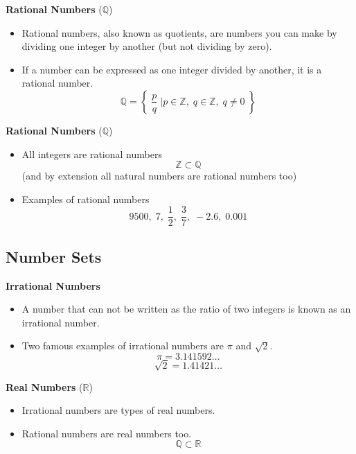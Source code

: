\documentclass[11pt,a4paper,titlepage,oneside,openany]{article}
\numberwithin{equation}{section}
\numberwithin{algorithm}{section}
\numberwithin{figure}{section}
\numberwithin{table}{section}
\begin{document}
{%
\textbf{Rational Numbers} ($\mathbb{Q}$)
\begin{itemize}
\item Rational numbers, also known as quotients, are numbers you can make by dividing one integer by another (but not dividing by zero). 
\item If a number can be expressed as one integer divided by another, it is a rational number.
\[ \mathbb{Q} = \left\{\; \frac{p}{q} \;\bigg| p \in \mathbb{Z},\; q \in \mathbb{Z},\; q \neq 0  \;   \right\}   \]
\end{itemize}



\textbf{Rational Numbers} ($\mathbb{Q}$)
\begin{itemize}
\item All integers are rational numbers 
\[ \mathbb{Z}  \subset \mathbb{Q}\]
(and by extension all natural numbers are rational numbers too)
\item Examples of rational numbers
\[ 9500,\;7,\; \frac{1}{2} ,\; \frac{3}{7},\; -2.6 ,\; 0.001\] 
\end{itemize}


\subsection{Number Sets}

\textbf{Irrational Numbers} 
\begin{itemize}
\item A number that can not be written as the ratio of two integers is known as an irrational number.
\item Two famous examples of irrational numbers are $\pi$ and $\sqrt{2}$. 
\[\pi = 3.141592\ldots\]
\[\sqrt{2} = 1.41421\ldots\]
\end{itemize}

\textbf{Real Numbers} ($\mathbb{R}$)
\begin{itemize}
\item Irrational numbers are types of real numbers.
\item Rational numbers are real numbers too.
\[ \mathbb{Q}  \subset \mathbb{R}\]


\end{itemize}}
\end{document}
